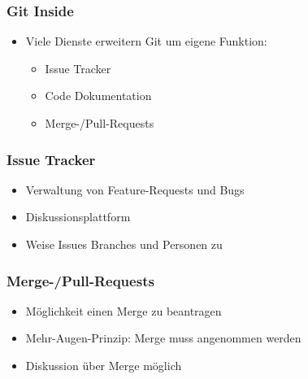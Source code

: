 \documentclass[12pt,utf8]{beamer}
\begin{document}
	\begin{frame}
		\frametitle{Git Inside}
		\begin{itemize}
			\item Viele Dienste erweitern Git um eigene Funktion:
			\begin{itemize}
				\item Issue Tracker
				\item Code Dokumentation
				\item Merge-/Pull-Requests
			\end{itemize}
		\end{itemize}
	\end{frame}

	\begin{frame}
		\frametitle{Issue Tracker}
		\begin{itemize}
			\item Verwaltung von Feature-Requests und Bugs
			\item Diskussionsplattform
			\item Weise Issues Branches und Personen zu
		\end{itemize}
	\end{frame}

	\begin{frame}
		\frametitle{Merge-/Pull-Requests}
		\begin{itemize}
			\item Möglichkeit einen Merge zu beantragen
			\item Mehr-Augen-Prinzip: Merge muss angenommen werden
			\item Diskussion über Merge möglich
		\end{itemize}
	\end{frame}
	
	\begin{frame}
		
		\tiny
	\end{frame}
	
\end{document}
